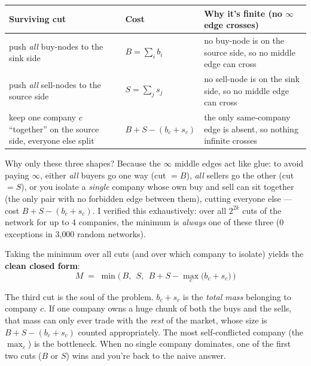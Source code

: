 \begin{center}
\renewcommand{\arraystretch}{1.4}\footnotesize
\begin{tabular}{@{}p{4.4cm}p{3.2cm}p{6.0cm}@{}}
\toprule
\textbf{Surviving cut} & \textbf{Cost} & \textbf{Why it's finite (no $\infty$ edge crosses)} \\
\midrule
push \emph{all} buy-nodes to the sink side & $B=\sum_i b_i$ & no buy-node is on the source side, so no middle edge can cross \\
push \emph{all} sell-nodes to the source side & $S=\sum_j s_j$ & no sell-node is on the sink side, so no middle edge can cross \\
keep one company $c$ ``together'' on the source side, everyone else split & $B+S-(b_c+s_c)$ & the only same-company edge is absent, so nothing infinite crosses \\
\bottomrule
\end{tabular}
\end{center}

\begin{intu}
Why only these three shapes? Because the $\infty$ middle edges act like glue: to
avoid paying $\infty$, either \emph{all} buyers go one way (cut $=B$), \emph{all}
sellers go the other (cut $=S$), or you isolate a \emph{single} company whose own
buy and sell can sit together (the only pair with no forbidden edge between them),
cutting everyone else --- cost $B+S-(b_c+s_c)$. I verified this exhaustively: over
all $2^{2k}$ cuts of the network for up to 4 companies, the minimum is \emph{always}
one of these three (0 exceptions in 3{,}000 random networks).
\end{intu}

Taking the minimum over all cuts (and over which company to isolate) yields the
\textbf{clean closed form}:
\[
\boxed{\;M \;=\; \min\Big(\,B,\ \ S,\ \ B+S-\max_{c}\big(b_c+s_c\big)\,\Big)\;}
\tag{Form B}
\]

\begin{intu}
The third cut is the soul of the problem. $b_c+s_c$ is the \emph{total mass}
belonging to company $c$. If one company owns a huge chunk of both the buys and
the sells, that mass can only ever trade with the \emph{rest} of the market, whose
size is $B+S-(b_c+s_c)$ counted appropriately. The most self-conflicted company
(the $\max_c$) is the bottleneck. When no single company dominates, one of the
first two cuts ($B$ or $S$) wins and you're back to the naive answer.
\end{intu}


